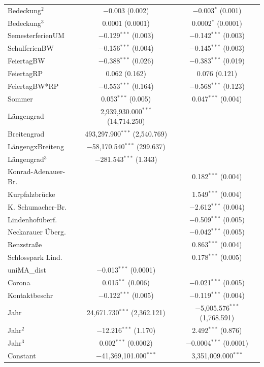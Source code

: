 \documentclass[a4paper,12pt]{thesis}
\begin{document}
\begin{longtable}{@{\extracolsep{-5pt}}lcc}
		Bedeckung$^2$ & $-$0.003 (0.002) & $-$0.003$^{*}$ (0.001) \\ 
		Bedeckung$^3$ & 0.0001 (0.0001) & 0.0002$^{*}$ (0.0001) \\ 
		SemesterferienUM & $-$0.129$^{***}$ (0.003) & $-$0.142$^{***}$ (0.003) \\ 
		SchulferienBW & $-$0.156$^{***}$ (0.004) & $-$0.145$^{***}$ (0.003) \\ 
		FeiertagBW & $-$0.388$^{***}$ (0.026) & $-$0.383$^{***}$ (0.019) \\ 
		FeiertagRP & 0.062 (0.162) & 0.076 (0.121) \\ 
		FeiertagBW*RP & $-$0.553$^{***}$ (0.164) & $-$0.568$^{***}$ (0.123) \\ 
		Sommer & 0.053$^{***}$ (0.005) & 0.047$^{***}$ (0.004) \\ 
		Längengrad & 2,939,930.000$^{***}$ (14,714.250) &  \\ 
		Breitengrad & 493,297.900$^{***}$ (2,540.769) &  \\ 
		LängengxBreiteng & $-$58,170.540$^{***}$ (299.637) &  \\ 
		Längengrad$^3$ & $-$281.543$^{***}$ (1.343) &  \\ 
		Konrad-Adenauer-Br. &  & 0.182$^{***}$ (0.004) \\ 
		Kurpfalzbrücke &  & 1.549$^{***}$ (0.004) \\ 
		K. Schumacher-Br. &  & $-$2.612$^{***}$ (0.004) \\ 
		Lindenhofüberf. &  & $-$0.509$^{***}$ (0.005) \\ 
		Neckarauer Überg. &  & $-$0.042$^{***}$ (0.005) \\ 
		Renzstraße &  & 0.863$^{***}$ (0.004) \\ 
		Schlosspark Lind. &  & 0.178$^{***}$ (0.005) \\ 
		uniMA\_dist & $-$0.013$^{***}$ (0.0001) &  \\ 
		Corona & 0.015$^{**}$ (0.006) & $-$0.021$^{***}$ (0.005) \\ 
		Kontaktbeschr & $-$0.122$^{***}$ (0.005) & $-$0.119$^{***}$ (0.004) \\ 
		Jahr & 24,671.730$^{***}$ (2,362.121) & $-$5,005.576$^{***}$ (1,768.591) \\ 
		Jahr$^2$ & $-$12.216$^{***}$ (1.170) & 2.492$^{***}$ (0.876) \\ 
		Jahr$^3$ & 0.002$^{***}$ (0.0002) & $-$0.0004$^{***}$ (0.0001) \\ 
		Constant & $-$41,369,101.000$^{***}$ & 3,351,009.000$^{***}$  \\ 

\end{longtable}
\end{document}
